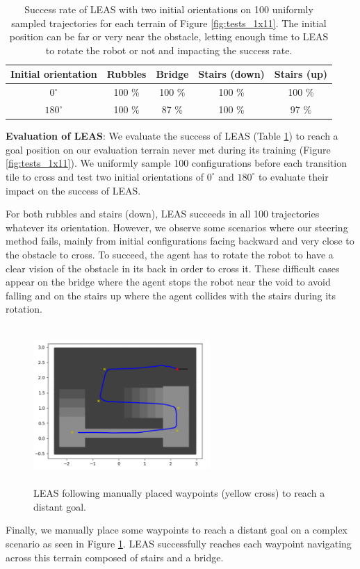 \begin{table}[h!]
\centering
\begin{tabular}{ |c|c|c|c|c| } 
    \hline
    Initial orientation & Rubbles & Bridge & Stairs (down) & Stairs (up) \\ 
    \hline
    $0^{\circ}$ & 100 \% & 100 \% & 100 \% & 100 \%  \\ 
    \hline
    $180^{\circ}$ & 100 \% & 87 \% & 100 \% & 97 \% \\
    \hline
\end{tabular}
\caption{Success rate of LEAS with two initial orientations on 100 uniformly sampled trajectories for each terrain of Figure \ref{fig:tests_1x11}. The initial position can be far or very near the obstacle, letting enough time to LEAS to rotate the robot or not and impacting the success rate.}
\label{tab:tests_1x11}
\end{table}

\textbf{Evaluation of LEAS}: We evaluate the success of LEAS (Table \ref{tab:tests_1x11}) to reach a goal position on our evaluation terrain never met during its training (Figure \ref{fig:tests_1x11}).
We uniformly sample 100 configurations before each transition tile to cross and test two initial orientations of $0^{\circ}$ and $180^{\circ}$ to evaluate their impact on the success of LEAS. 

For both rubbles and stairs (down), LEAS succeeds in all 100 trajectories whatever its orientation. 
However, we observe some scenarios where our steering method fails, mainly from initial configurations facing backward and very close to the obstacle to cross. To succeed, the agent has to rotate the robot to have a clear vision of the obstacle in its back in order to cross it. 
These difficult cases appear on the bridge where the agent stops the robot near the void to avoid falling and on the stairs up where the agent collides with the stairs during its rotation.

\begin{figure}
    \centering
    \includegraphics[width=0.6\textwidth, height=6cm]{Figures/Chapter_LEAS/follow_waypoints_bauzil.png}
    \caption{LEAS following manually placed waypoints (yellow cross) to reach a distant goal.}
    \label{fig:bauzil_waypoints}
\end{figure}
Finally, we manually place some waypoints to reach a distant goal on a complex scenario as seen in Figure \ref{fig:bauzil_waypoints}. LEAS successfully reaches each waypoint navigating across this terrain composed of stairs and a bridge.



